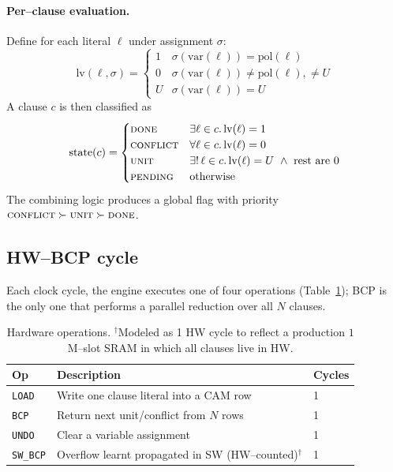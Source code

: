 \documentclass[11pt,letterpaper]{article}
\begin{document}
\paragraph{Per--clause evaluation.} Define for each literal $\ell$
under assignment $\sigma$:
\[
\mathrm{lv}(\ell,\sigma) =
\begin{cases}
1 & \sigma(\mathrm{var}(\ell)) = \mathrm{pol}(\ell)\\
0 & \sigma(\mathrm{var}(\ell)) \neq \mathrm{pol}(\ell), \neq U\\
U & \sigma(\mathrm{var}(\ell)) = U
\end{cases}
\]
A clause $c$ is then classified as
\[
\mathrm{state}(c)=
\begin{cases}
\textsc{done}     & \exists \ell \in c.\, \mathrm{lv}(\ell)=1\\
\textsc{conflict} & \forall \ell \in c.\, \mathrm{lv}(\ell)=0\\
\textsc{unit}     & \exists !\, \ell \in c.\, \mathrm{lv}(\ell)=U\ \wedge\ \text{rest are }0\\
\textsc{pending}  & \text{otherwise}
\end{cases}
\]
The combining logic produces a global flag with priority
$\textsc{conflict} \succ \textsc{unit} \succ \textsc{done}$.

\subsection{HW--BCP cycle}
Each clock cycle, the engine executes one of four operations
(Table~\ref{tab:ops}); BCP is the only one that performs a parallel
reduction over all $N$ clauses.

\begin{table}[h]
\centering\small
\begin{tabular}{lll}
\toprule
\textbf{Op} & \textbf{Description} & \textbf{Cycles}\\
\midrule
\texttt{LOAD}    & Write one clause literal into a CAM row & 1\\
\texttt{BCP}     & Return next unit/conflict from $N$ rows & 1\\
\texttt{UNDO}    & Clear a variable assignment & 1\\
\texttt{SW\_BCP} & Overflow learnt propagated in SW (HW--counted)$^\dagger$ & 1\\
\bottomrule
\end{tabular}
\caption{Hardware operations. $^\dagger$Modeled as 1 HW cycle to reflect a production
$1$M--slot SRAM in which all clauses live in HW.}
\label{tab:ops}
\end{table}
\end{document}
